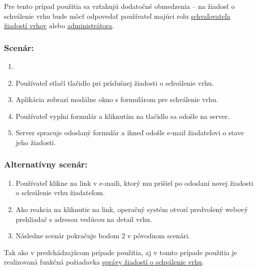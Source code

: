 Pre tento prípad použitia sa vzťahujú dodatočné obmedzenia -- na žiadosť o schválenie vrhu bude môcť odpovedať používateľ majúci rolu \hyperref[schvalovatel-vrhov]{schvaľovateľa žiadostí vrhov} alebo \hyperref[administrator]{administrátora}.

\subsubsection*{Scenár:}

\begin{enumerate}
	\item {}
	\item Používateľ stlačí tlačidlo  pri príslušnej žiadosti o schválenie vrhu.
	\item Aplikácia zobrazí modálne okno s formulárom pre schválenie vrhu.
	\item Používateľ vyplní formulár a kliknutím na tlačidlo  sa odošle na server.
	\item Server spracuje odoslaný formulár a ihneď odošle e-mail žiadateľovi o stave jeho žiadosti.
\end{enumerate}

\subsubsection*{Alternatívny scenár:}

\begin{enumerate}
	\item Používateľ klikne na link v e-maili, ktorý mu prišiel po odoslaní novej žiadosti o schválenie vrhu žiadateľom.
	\item Ako reakcia na kliknutie na link, operačný systém otvorí predvolený webový prehliadač s adresou vedúcou na detail vrhu.
	\item Následne scenár pokračuje bodom 2 v pôvodnom scenári.
\end{enumerate}

Tak ako v predchádzajúcom prípade použitia, aj v tomto prípade použitia je realizovaná funkčná požiadavka \hyperref[sprava-ziadosti-o-schvalenie-vrhu]{správy žiadostí o schválenie vrhu}.
	
